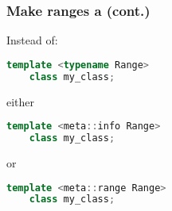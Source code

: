 \documentclass[compress,table,xcolor=table]{beamer}
\begin{document}
\begin{frame}[fragile]
\frametitle{Make ranges a  (cont.)}
    \Large
    Instead of:
    \begin{lstlisting}[language=c++]
    template <typename Range>
    class my_class;
    \end{lstlisting}
    either
    \begin{lstlisting}[language=c++]
    template <meta::info Range>
    class my_class;
    \end{lstlisting}
    or
    \begin{lstlisting}[language=c++]
    template <meta::range Range>
    class my_class;
    \end{lstlisting}
\end{frame}
\begin{frame}
    \LARGE
    \vfill
    \Huge
    \vfill
    \large
\end{frame}
\end{document}
